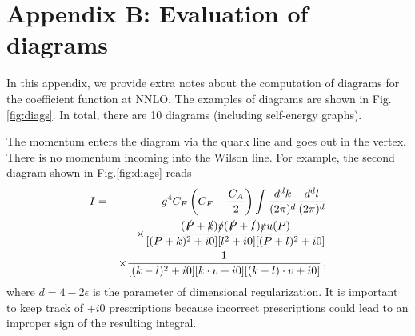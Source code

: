\documentclass[aps,prl,twocolumn,secnumarabic,notitlepage,superscriptaddress,nofootinbib,tightenlines,floatfix,preprintnumbers]{revtex4-1}
\newcommand{\nn}{\nonumber}
\renewcommand{\(}{\left(}
\renewcommand{\)}{\right)}
\renewcommand{\[}{\left[}
\renewcommand{\]}{\right]}
\newcommand{\fnot}[1]{\slashed{#1}}
\begin{document}
\section{Appendix B: Evaluation of diagrams}

In this appendix, we provide extra notes about the computation of diagrams for the coefficient function at NNLO. The examples of diagrams are shown in Fig.\ref{fig:diags}. In total, there are 10 diagrams (including self-energy graphs). 

The momentum enters the diagram via the quark line and goes out in the vertex. There is no momentum incoming into the Wilson line.  For example, the second diagram shown in Fig.\ref{fig:diags} reads
\begin{eqnarray}\label{app:example}
I&=&-g^4C_F\(C_F-\frac{C_A}{2}\)\int \frac{d^dk}{(2\pi)^d}\frac{d^dl}{(2\pi)^d}
\\\nn &&\times \frac{(\fnot P+\fnot k)\fnot v (\fnot P+\fnot l)\fnot v u(P)}{[(P+k)^2+i0][l^2+i0][(P+l)^2+i0]}
\\\nn
&&\times\frac{1}{[(k-l)^2+i0][k\cdot v+i0][(k-l)\cdot v+i0]}\,,
\end{eqnarray}
where $d=4-2\epsilon$ is the parameter of dimensional regularization. It is important to keep track of $+i0$ prescriptions because incorrect prescriptions could lead to an improper sign of the resulting integral.
\end{document}
